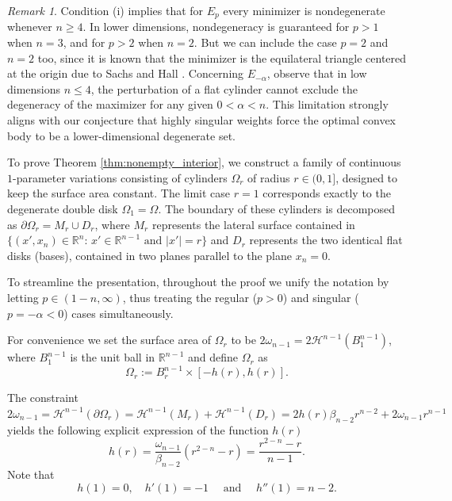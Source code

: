 \documentclass[10pt,leqno]{amsart}
\newcommand{\R}[0]{\mathbb{R}}
\newcommand{\p}{\partial}
\numberwithin{Theorem}{section}
\theoremstyle{definition}
\theoremstyle{remark}
\newtheorem{Remark}[Theorem]{Remark}
\numberwithin{equation}{section}
\numberwithin{equation}{section}
\begin{document}
\begin{Remark}
    Condition (i) implies that for $E_p$ every minimizer is nondegenerate whenever $n \ge 4$. In lower dimensions, nondegeneracy is guaranteed for $p>1$ when $n=3$, and for $p> 2$ when $n=2$. But we can include the case $p=2$ and $n=2$ too, since it is known that the minimizer is the equilateral triangle centered at the origin due to  Sachs \cite{SachsIandII} and Hall \cite{Hall1985}. Concerning $E_{-\alpha}$, observe that in low dimensions $n \le 4$, the perturbation of a flat cylinder cannot exclude the degeneracy of the maximizer for any given $0<\alpha<n$. This limitation strongly aligns with our conjecture that highly singular weights force the optimal convex body to be a lower-dimensional degenerate set.
\end{Remark}




To prove Theorem \ref{thm:nonempty_interior}, we construct a family of continuous $1$-parameter variations consisting of cylinders $\Omega_r$ of radius $r \in (0,1]$, designed to keep the surface area constant. The limit case $r=1$ corresponds exactly to the degenerate double disk $\Omega_1=\Omega$. The boundary of these cylinders is decomposed as $\partial\Omega_r = M_r \cup D_r$, where $M_r$ represents the lateral surface contained in $\{(x',x_n)\in\R^n:\,x'\in\R^{n-1}\text{ and }|x'|=r\}$ and $D_r$ represents the two identical flat disks (bases), contained in two planes parallel to the plane $x_n=0$.

To streamline the presentation, throughout the proof we unify the notation by letting $p \in (1-n, \infty)$, thus treating the regular ($p>0$) and singular ($p = -\alpha < 0$) cases simultaneously. 




For convenience we set the surface area of $\Omega_r$ to be $2 \omega_{n-1}=2\mathcal{H}^{n-1}(B_1^{n-1})$, where $B_1^{n-1}$ is the unit ball in $\R^{n-1}$ and define $\Omega_r$ as
\[
\Omega_r := B_{r}^{n-1} \times [-h(r),h(r)].
\]

The constraint $2 \omega_{n-1}=\mathcal{H}^{n-1}(\p \Omega_r)= \mathcal{H}^{n-1}(M_r)+ \mathcal{H}^{n-1}(D_r)=2 h(r) \beta_{n-2}r^{n-2}+2\omega_{n-1}r^{n-1}$ yields the following explicit expression of the function $h(r)$
\[
h(r)=\frac{\omega_{n-1}}{\beta_{n-2}} \left(r^{2-n}-r \right)=\frac{r^{2-n}-r}{n-1}.
\]
Note that
$$
  h(1)=0,\quad h'(1)=-1\quad \text{ and }\quad h''(1)=n-2. 
$$
\end{document}
